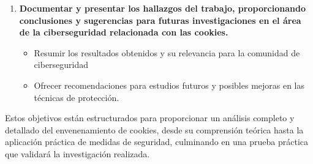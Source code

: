 \begin{enumerate}
    \newpage

    \item {\textbf{Documentar y presentar los hallazgos del trabajo, proporcionando conclusiones y sugerencias para futuras investigaciones en el área de la ciberseguridad relacionada con las cookies.}
    \begin{itemize}
        \item Resumir los resultados obtenidos y su relevancia para la comunidad de ciberseguridad
        \item Ofrecer recomendaciones para estudios futuros y posibles mejoras en las técnicas de protección.
    \end{itemize} }
\end{enumerate}

Estos objetivos están estructurados para proporcionar un análisis completo y detallado del envenenamiento de cookies, desde su comprensión teórica hasta la aplicación práctica de medidas de seguridad, culminando en una prueba práctica que validará la investigación realizada.

